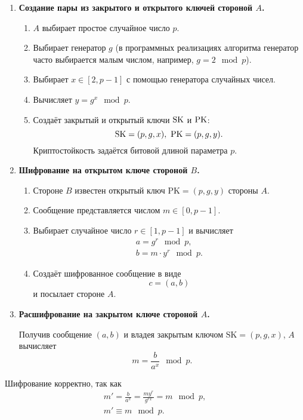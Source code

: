 \begin{enumerate}
    \item \textbf{Создание пары из закрытого и открытого ключей стороной $A$.}
        \begin{enumerate}
            \item $A$ выбирает простое случайное число $p$.
            \item Выбирает генератор $g$ (в программных реализациях алгоритма генератор часто выбирается малым числом, например, $g = 2 \mod p$).
            \item Выбирает $x \in [2, p - 1]$ с помощью генератора случайных чисел.
            \item Вычисляет $y=g^{x}\mod p$.
            \item Создаёт закрытый и открытый ключи $\textrm{SK}$ и $\textrm{PK}$:
                \[ \textrm{SK} = (p, g, x), ~ \textrm{PK} = (p, g, y). \]
                Криптостойкость задаётся битовой длиной параметра $p$.
        \end{enumerate}
    \item \textbf{Шифрование на открытом ключе стороной $B$.}
        \begin{enumerate}
            \item Стороне $B$ известен открытый ключ $\text{PK} = (p, g, y)$ стороны $A$.
            \item Сообщение представляется числом $m \in [0, p-1]$.
            \item Выбирает случайное число $r \in [1, p-1]$ и вычисляет
                \[ \begin{array}{l}
                    a = g^r \mod p, \\
                    b = m \cdot y^r \mod p.
                \end{array} \]
            \item Создаёт шифрованное сообщение в виде
                \[ c = (a, b) \]
                и посылает стороне $A$.
        \end{enumerate}
    \item \textbf{Расшифрование на закрытом ключе стороной $A$.}

	Получив сообщение $(a, b)$ и владея закрытым ключом $\text{SK} = (p, g, x)$, $A$ вычисляет
                \[ m = \frac{b}{a^x} \mod p. \]
\end{enumerate}

Шифрование корректно, так как 
\[ \begin{array}{l}
    m' = \frac{b}{a^x} = \frac{m y^r}{g^{rx}} = m \mod p, \\
    m' \equiv m \mod p.
\end{array} \]

